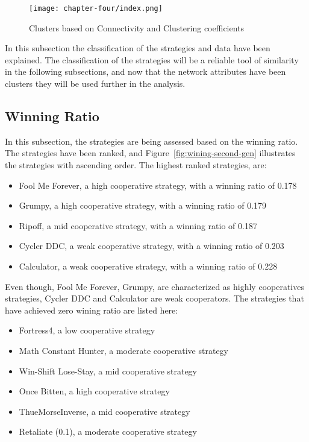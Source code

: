 \begin{figure}[H]
	\texttt{[image: chapter-four/index.png]}
	\caption{Clusters based on Connectivity and Clustering coefficients}
	\label{fig:clusters}
\end{figure}

In this subsection the classification of the strategies and data have been
explained. The classification of the strategies will be a reliable tool
of similarity in the following subsections, and now that the network
attributes have been clusters they will be used further in the analysis.

\subsection{Winning Ratio}
In this subsection, the strategies are being assessed based on the winning ratio.
The strategies have been ranked, and Figure~\ref{fig:wining-second-gen}
illustrates the strategies with ascending order. The highest ranked strategies,
are:
\begin{itemize}
	\item Fool Me Forever, a high cooperative strategy, with a winning ratio of 0.178
	\item Grumpy, a high cooperative strategy, with a winning ratio of 0.179
	\item Ripoff, a mid cooperative strategy, with a winning ratio of 0.187
	\item Cycler DDC, a weak cooperative strategy, with a winning ratio of 0.203
	\item Calculator, a weak cooperative strategy, with a winning ratio of 0.228
\end{itemize}

Even though, Fool Me Forever, Grumpy, are characterized as highly
cooperatives strategies, Cycler DDC and Calculator are weak cooperators. The
strategies that have achieved zero wining ratio are listed here:
\begin{itemize}
	\item Fortress4, a low cooperative strategy
	\item Math Constant Hunter, a moderate cooperative strategy
	\item Win-Shift Lose-Stay, a mid cooperative strategy
	\item Once Bitten, a high cooperative strategy
	\item ThueMorseInverse, a mid cooperative strategy
	\item Retaliate (0.1), a moderate cooperative strategy
\end{itemize}

